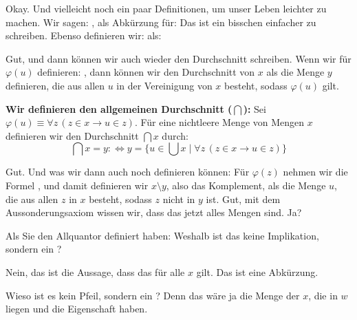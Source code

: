 \begin{spoken-clean}[00:35:00 - 00:36:56]
Okay. Und vielleicht noch ein paar Definitionen, um unser Leben leichter zu machen. Wir sagen: , als Abkürzung für:  Das ist ein bisschen einfacher zu schreiben. Ebenso definieren wir:  als: 

Gut, und dann können wir auch wieder den Durchschnitt schreiben. Wenn wir für $\varphi(u)$ definieren: , dann können wir den Durchschnitt von $x$ als die Menge $y$ definieren, die aus allen $u$ in der Vereinigung von $x$ besteht, sodass $\varphi(u)$ gilt.
\end{spoken-clean}

\begin{math-stroke}
\textbf{Wir definieren den allgemeinen Durchschnitt ($\bigcap$):}
Sei $\varphi(u) \equiv \forall z \, (z \in x \rightarrow u \in z)$. Für eine nichtleere Menge von Mengen $x$ definieren wir den Durchschnitt $\bigcap x$ durch:
\[
\bigcap x = y :\iff y = \bigl\{ u \in \bigcup x \;\big|\; \forall z \, (z \in x \rightarrow u \in z) \bigr\}
\]
\end{math-stroke}

\begin{spoken-clean}[00:36:56 - 00:38:38]
Gut. Und was wir dann auch noch definieren können: Für $\varphi(z)$ nehmen wir die Formel , und damit definieren wir $x \setminus y$, also das Komplement, als die Menge $u$, die aus allen $z$ in $x$ besteht, sodass $z$ nicht in $y$ ist. Gut, mit dem Aussonderungsaxiom wissen wir, dass das jetzt alles Mengen sind. Ja?
\end{spoken-clean}

\begin{student-interaction}[Studentenfrage]
Als Sie den Allquantor definiert haben: Weshalb ist das keine Implikation, sondern ein ?
\end{student-interaction}

\begin{spoken-clean}[continued]
Nein, das ist die Aussage, dass das für alle $x$ gilt. Das ist eine Abkürzung.
\end{spoken-clean}

\begin{student-interaction}[Studentenfrage]
Wieso ist es kein Pfeil, sondern ein ? Denn das wäre ja die Menge der $x$, die in $w$ liegen und die Eigenschaft haben.
\end{student-interaction}

